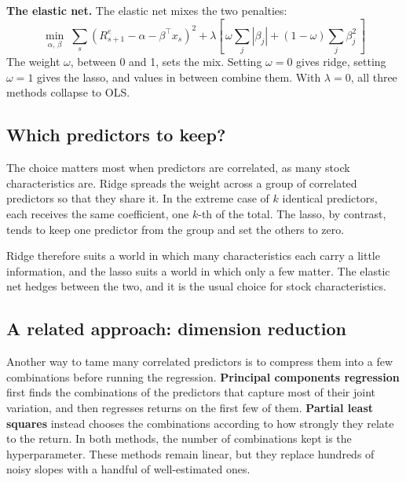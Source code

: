 \textbf{The elastic net.} The elastic net  mixes the two penalties:
\begin{equation}
  \min_{\alpha,\,\beta} \; \sum_{s} \left(R^{e}_{s+1} - \alpha - \beta^{\top} x_s\right)^2
  + \lambda \left[\, \omega \sum_{j} |\beta_j| + (1-\omega) \sum_{j} \beta_j^2 \,\right]
  \label{eq:21-enet}
\end{equation}
The weight $\omega$, between 0 and 1, sets the mix. Setting $\omega = 0$ gives ridge, setting $\omega = 1$ gives the lasso, and values in between combine them. With $\lambda = 0$, all three methods collapse to OLS.


\subsection{Which predictors to keep?}

The choice matters most when predictors are correlated, as many stock characteristics are. Ridge spreads the weight across a group of correlated predictors so that they share it. In the extreme case of $k$ identical predictors, each receives the same coefficient, one $k$-th of the total. The lasso, by contrast, tends to keep one predictor from the group and set the others to zero.

Ridge therefore suits a world in which many characteristics each carry a little information, and the lasso suits a world in which only a few matter. The elastic net hedges between the two, and it is the usual choice for stock characteristics.

\subsection{A related approach: dimension reduction}

Another way to tame many correlated predictors is to compress them into a few combinations before running the regression. \textbf{Principal components regression} first finds the combinations of the predictors that capture most of their joint variation, and then regresses returns on the first few of them. \textbf{Partial least squares} instead chooses the combinations according to how strongly they relate to the return. In both methods, the number of combinations kept is the hyperparameter. These methods remain linear, but they replace hundreds of noisy slopes with a handful of well-estimated ones.


